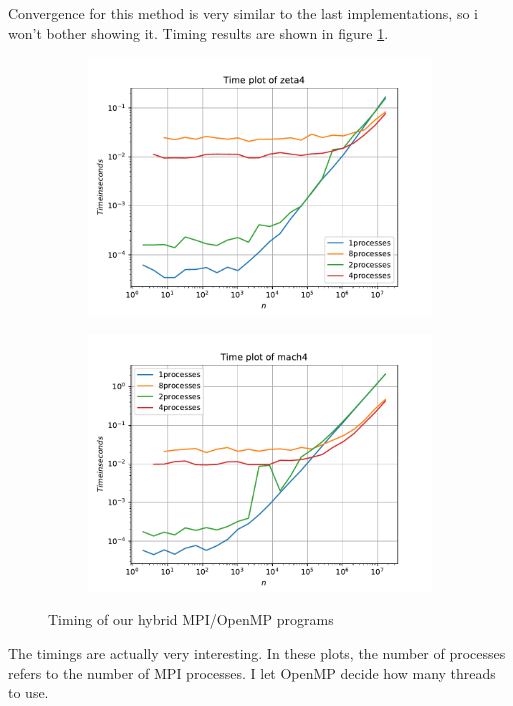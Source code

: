 \documentclass[12pt]{article}
\begin{document}
Convergence for this method is very similar to the last
implementations, so i won't bother showing it. Timing results are shown in figure \ref{fig:Time4}.
\begin{figure}
    \centering
    \begin{subfigure}[!htb]{0.45\textwidth}
        \includegraphics[width=\textwidth]{zeta4Time}
    \end{subfigure}
    \begin{subfigure}[!htb]{0.45\textwidth}
        \includegraphics[width=\textwidth]{mach4Time}
    \end{subfigure}
    \caption{Timing of our hybrid MPI/OpenMP programs}\label{fig:Time4}
\end{figure}
The timings are actually very interesting. In these plots, the number of processes refers to the number of MPI processes. I let OpenMP decide how many threads to use. 
\end{document}
